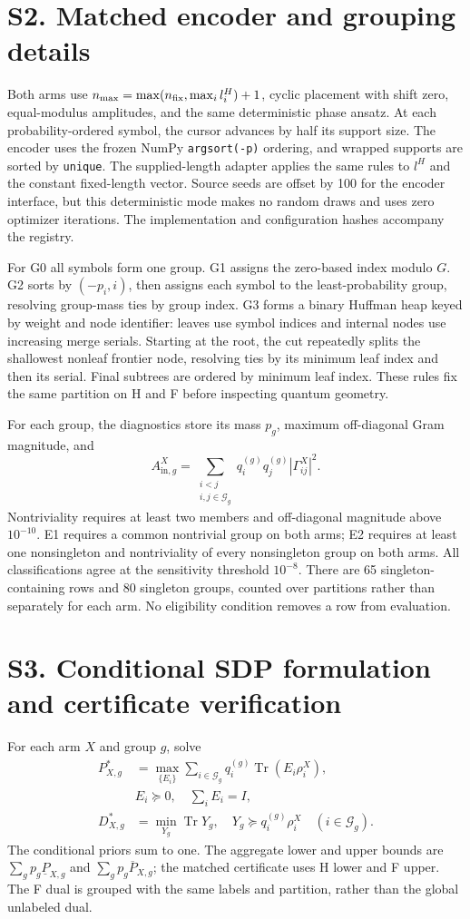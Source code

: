 \documentclass[10pt]{article}
\newcommand{\suppsection}[1]{\section*{#1}}
\begin{document}
\suppsection{S2. Matched encoder and grouping details}
Both arms use $n_{\max}=\max(n_{\rm fix},\max_i l_i^H)+1$, cyclic placement with shift zero, equal-modulus amplitudes, and the same deterministic phase ansatz. At each probability-ordered symbol, the cursor advances by half its support size. The encoder uses the frozen NumPy \texttt{argsort(-p)} ordering, and wrapped supports are sorted by \texttt{unique}. The supplied-length adapter applies the same rules to $l^H$ and the constant fixed-length vector. Source seeds are offset by 100 for the encoder interface, but this deterministic mode makes no random draws and uses zero optimizer iterations. The implementation and configuration hashes accompany the registry.

For G0 all symbols form one group. G1 assigns the zero-based index modulo $G$. G2 sorts by $(-p_i,i)$, then assigns each symbol to the least-probability group, resolving group-mass ties by group index. G3 forms a binary Huffman heap keyed by weight and node identifier: leaves use symbol indices and internal nodes use increasing merge serials. Starting at the root, the cut repeatedly splits the shallowest nonleaf frontier node, resolving ties by its minimum leaf index and then its serial. Final subtrees are ordered by minimum leaf index. These rules fix the same partition on H and F before inspecting quantum geometry.

For each group, the diagnostics store its mass $p_g$, maximum off-diagonal Gram magnitude, and
\begin{equation}
 A_{\mathrm{in},g}^X=\sum_{\substack{i<j\\i,j\in\mathcal G_g}}q_i^{(g)}q_j^{(g)}|\Gamma_{ij}^X|^2.
\end{equation}
Nontriviality requires at least two members and off-diagonal magnitude above $10^{-10}$. E1 requires a common nontrivial group on both arms; E2 requires at least one nonsingleton and nontriviality of every nonsingleton group on both arms. All classifications agree at the sensitivity threshold $10^{-8}$. There are 65 singleton-containing rows and 80 singleton groups, counted over partitions rather than separately for each arm. No eligibility condition removes a row from evaluation.

\suppsection{S3. Conditional SDP formulation and certificate verification}
For each arm $X$ and group $g$, solve
\begin{align}
 P_{X,g}^*&=\max_{\{E_i\}}\sum_{i\in\mathcal G_g}q_i^{(g)}\operatorname{Tr}(E_i\rho_i^X),\\
 &E_i\succeq0,\quad\sum_iE_i=I,\nonumber\\
 D_{X,g}^*&=\min_{Y_g}\operatorname{Tr}Y_g,\quad
 Y_g\succeq q_i^{(g)}\rho_i^X\quad(i\in\mathcal G_g).
\end{align}
The conditional priors sum to one. The aggregate lower and upper bounds are $\sum_gp_g\underline P_{X,g}$ and $\sum_gp_g\overline P_{X,g}$; the matched certificate uses H lower and F upper. The F dual is grouped with the same labels and partition, rather than the global unlabeled dual.
\end{document}
